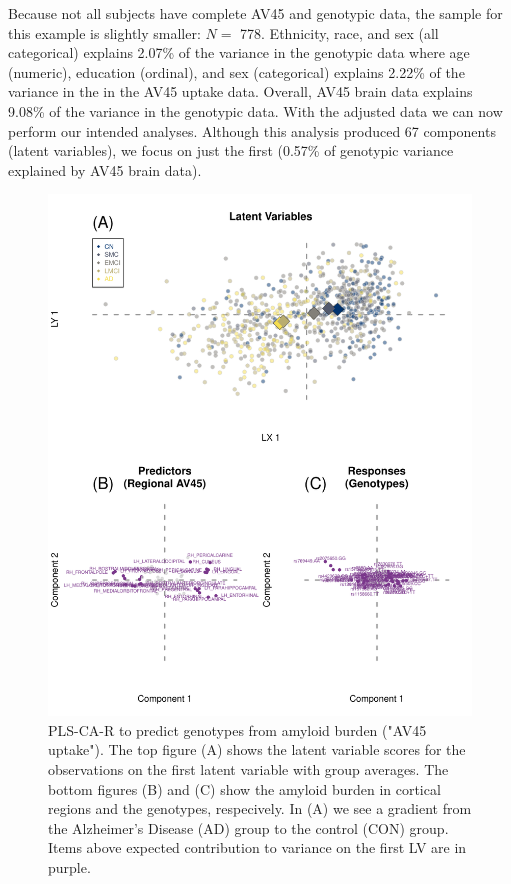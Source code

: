 \documentclass[12pt]{article}
\begin{document}
Because not all subjects have complete AV45 and genotypic data, the
sample for this example is slightly smaller: \(N=\) 778. Ethnicity,
race, and sex (all categorical) explains 2.07\% of the variance in the
genotypic data where age (numeric), education (ordinal), and sex
(categorical) explains 2.22\% of the variance in the in the AV45 uptake
data. Overall, AV45 brain data explains 9.08\% of the variance in the
genotypic data. With the adjusted data we can now perform our intended
analyses. Although this analysis produced 67 components (latent
variables), we focus on just the first (0.57\% of genotypic variance
explained by AV45 brain data).

\begin{figure}[!hbtp]

{\centering \includegraphics[width=.8\textwidth,height=.8\textheight]{PLSCAR_to_a_GPLS_files/figure-latex/unnamed-chunk-13-1} 

}

\caption{\label{fig:brain_genotypes_ex2} PLS-CA-R to predict genotypes from amyloid burden ("AV45 uptake"). The top figure (A) shows the latent variable scores for the observations on the first latent variable with group averages. The bottom figures (B) and (C) show the amyloid burden in cortical regions and the genotypes, respecively. In (A) we see a gradient from the Alzheimer's Disease (AD) group to the control (CON) group. Items above expected contribution to variance on the first LV are in purple.}\label{fig:unnamed-chunk-13}
\end{figure}
\end{document}
